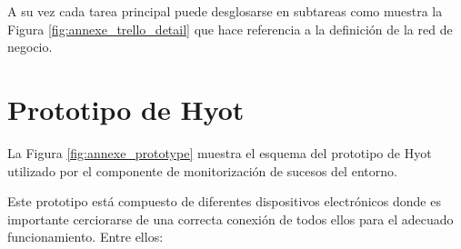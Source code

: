 \documentclass[12pt,a4paper, twoside]{report}
\begin{document}
	A su vez cada tarea principal puede desglosarse en subtareas como muestra la Figura \ref{fig:annexe_trello_detail} que hace referencia a la definición de la red de negocio.

			
	\chapter{Prototipo de Hyot}\label{prototype}
	
	La Figura \ref{fig:annexe_prototype} muestra el esquema del \gls{prototipo} de Hyot utilizado por el componente de monitorización de sucesos del entorno.
	
		
	Este \gls{prototipo} está compuesto de diferentes dispositivos electrónicos donde es importante cerciorarse de una correcta conexión de todos ellos para el adecuado funcionamiento. Entre ellos:
		
\end{document}
